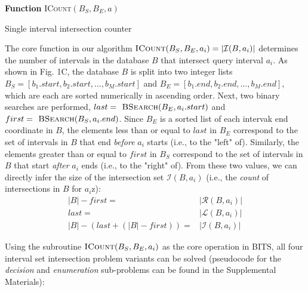\documentclass{bioinfo}
\begin{document}
        \begin{algorithm}[h]
                \DontPrintSemicolon
                \footnotesize
                \BlankLine
                \textbf{Function} \textsc{ICount}$(B_S,B_E,a)$
                \caption{Single interval intersection counter}
        \end{algorithm}

        The core function in our algorithm 
        $\textsc{ICount}(B_S,B_E,a_i) = |\mathcal{I}(B,a_i)|$ determines the number of
        intervals in the database $B$ that intersect query interval $a_i$.  As shown in
        Fig. 1C, the database $B$ is split into two integer lists 
        $B_S = [b_1.start, b_2.start, \dots, b_M.start]$ and 
        $B_E = [b_1.end, b_2.end, \dots, b_M.end]$, which are each are sorted  
        numerically in ascending order.  Next, two binary searches are performed,
        $last=\textsc{ BSearch}(B_E, a_i.start)$ and 
        $first=\textsc{ BSearch}(B_S, a_i.end)$.  Since $B_E$ is a sorted list of each
        intervak end coordinate in $B$, the elements
        less than or equal to $last$ in $B_E$ correspond to the set of intervals in $B$
        that end \emph{before} $a_i$ starts (i.e., to the "left" of).
        Similarly, the elements greater than or equal to $first$ in $B_S$ correspond to the
        set of intervals in $B$ that start \emph{after} $a_i$ ends 
        (i.e., to the "right" of).  From these two values, 
        we can directly infer the size of the intersection set $\mathcal{I}(B,a_i)$ 
        (i.e., the \emph{count} of intersections in $B$ for $a_i$z):
        \begin{equation*}
                \begin{split}
                        |B|-first=&|\mathcal{R}(B,a_i)| \\
                        last=&|\mathcal{L}(B,a_i)| \\ 
                        |B|-(last+(|B|-first))=&|\mathcal{I}(B,a_i)|
                \end{split}
        \end{equation*}

        Using the subroutine $\textsc{ICount}(B_S,B_E,a_i)$ as the core operation
        in BITS, all four interval set intersection problem variants can be 
        solved (pseudocode for the \emph{decision} and \emph{enumeration} sub-problems
        can be found in the Supplemental Materials):
\end{document}
